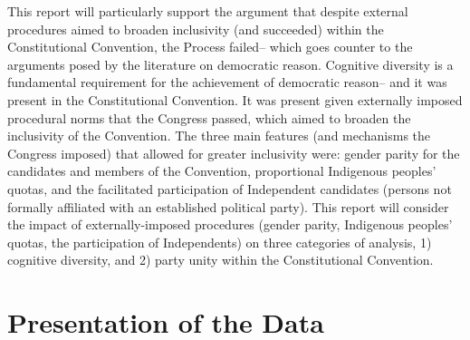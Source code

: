\documentclass[
  man]{apa6}
\begin{document}
This report will particularly support the argument that despite external procedures aimed to broaden inclusivity (and succeeded) within the Constitutional Convention, the Process failed-- which goes counter to the arguments posed by the literature on democratic reason. Cognitive diversity is a fundamental requirement for the achievement of democratic reason-- and it was present in the Constitutional Convention. It was present given externally imposed procedural norms that the Congress passed, which aimed to broaden the inclusivity of the Convention. The three main features (and mechanisms the Congress imposed) that allowed for greater inclusivity were: gender parity for the candidates and members of the Convention, proportional Indigenous peoples' quotas, and the facilitated participation of Independent candidates (persons not formally affiliated with an established political party). This report will consider the impact of externally-imposed procedures (gender parity, Indigenous peoples' quotas, the participation of Independents) on three categories of analysis, 1) cognitive diversity, and 2) party unity within the Constitutional Convention.

\hypertarget{presentation-of-the-data}{%
\section{Presentation of the Data}\label{presentation-of-the-data}}
\end{document}
